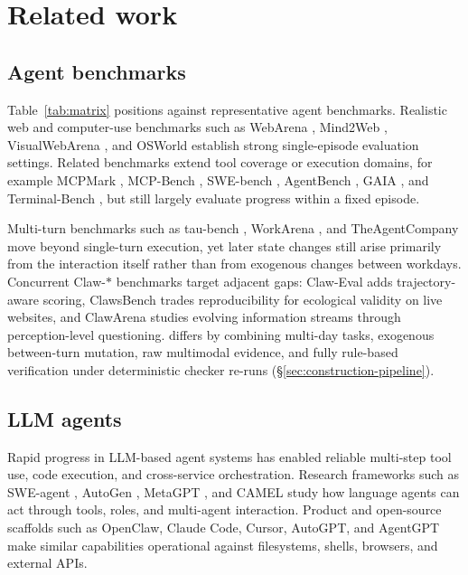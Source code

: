 
\section{Related work}
\label{sec:related}

\subsection{Agent benchmarks}
\label{sec:related-benchmarks}

Table~\ref{tab:matrix} positions \bench{} against representative agent benchmarks. Realistic web and computer-use benchmarks such as WebArena \cite{zhou2023webarena}, Mind2Web \cite{deng2023mind2web}, VisualWebArena \cite{koh2024visualwebarena}, and OSWorld \cite{xie2024osworld} establish strong single-episode evaluation settings. Related benchmarks extend tool coverage or execution domains, for example MCPMark \cite{wu2025mcpmark}, MCP-Bench \cite{wang2025mcp}, SWE-bench \cite{jimenez2023swe}, AgentBench \cite{liu2023agentbench}, GAIA \cite{mialon2023gaia}, and Terminal-Bench \cite{merrill2026terminal}, but still largely evaluate progress within a fixed episode.

Multi-turn benchmarks such as tau-bench \cite{yao2024tau}, WorkArena \cite{drouin2024workarena}, and TheAgentCompany \cite{xu2024theagentcompany} move beyond single-turn execution, yet later state changes still arise primarily from the interaction itself rather than from exogenous changes between workdays. Concurrent Claw-$\ast$ benchmarks target adjacent gaps: Claw-Eval \cite{ye2026claw} adds trajectory-aware scoring, ClawsBench \cite{li2026clawsbench} trades reproducibility for ecological validity on live websites, and ClawArena \cite{ji2026clawarena} studies evolving information streams through perception-level questioning. \bench{} differs by combining multi-day tasks, exogenous between-turn mutation, raw multimodal evidence, and fully rule-based verification under deterministic checker re-runs (\S\ref{sec:construction-pipeline}).

\subsection{LLM agents}
\label{sec:related-agents}

Rapid progress in LLM-based agent systems has enabled reliable multi-step tool use, code execution, and cross-service orchestration. Research frameworks such as SWE-agent \cite{yang2024swe}, AutoGen \cite{wu2024autogen}, MetaGPT \cite{hong2023metagpt}, and CAMEL \cite{li2023camel} study how language agents can act through tools, roles, and multi-agent interaction. Product and open-source scaffolds such as OpenClaw, Claude Code, Cursor, AutoGPT, and AgentGPT make similar capabilities operational against filesystems, shells, browsers, and external APIs.

